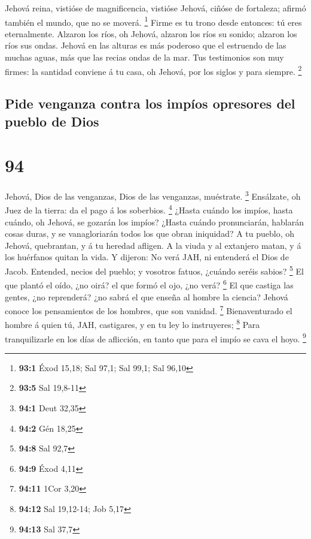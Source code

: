  Jehová reina, vistióse de magnificencia, vistióse Jehová,
ciñóse de fortaleza; afirmó también el mundo, que no se moverá.
\footnote{\textbf{93:1} Éxod 15,18; Sal 97,1; Sal 99,1; Sal 96,10}
 Firme es tu trono desde entonces: tú eres eternalmente.
 Alzaron los ríos, oh Jehová, alzaron los ríos su sonido;
alzaron los ríos sus ondas.  Jehová en las alturas es más
poderoso que el estruendo de las muchas aguas, más que las recias ondas
de la mar.  Tus testimonios son muy firmes: la santidad
conviene á tu casa, oh Jehová, por los siglos y para siempre.
\footnote{\textbf{93:5} Sal 19,8-11}

\hypertarget{pide-venganza-contra-los-impuxedos-opresores-del-pueblo-de-dios}{%
\subsection{Pide venganza contra los impíos opresores del pueblo de
Dios}\label{pide-venganza-contra-los-impuxedos-opresores-del-pueblo-de-dios}}

\hypertarget{section-93}{%
\section{94}\label{section-93}}

 Jehová, Dios de las venganzas, Dios de las venganzas,
muéstrate. \footnote{\textbf{94:1} Deut 32,35}  Ensálzate,
oh Juez de la tierra: da el pago á los soberbios. \footnote{\textbf{94:2}
  Gén 18,25}  ¿Hasta cuándo los impíos, hasta cuándo, oh
Jehová, se gozarán los impíos?  ¿Hasta cuándo pronunciarán,
hablarán cosas duras, y se vanagloriarán todos los que obran iniquidad?
 A tu pueblo, oh Jehová, quebrantan, y á tu heredad afligen.
 A la viuda y al extanjero matan, y á los huérfanos quitan
la vida.  Y dijeron: No verá JAH, ni entenderá el Dios de
Jacob.  Entended, necios del pueblo; y vosotros fatuos,
¿cuándo seréis sabios? \footnote{\textbf{94:8} Sal 92,7}  El
que plantó el oído, ¿no oirá? el que formó el ojo, ¿no verá? \footnote{\textbf{94:9}
  Éxod 4,11}  El que castiga las gentes, ¿no reprenderá?
¿no sabrá el que enseña al hombre la ciencia?  Jehová
conoce los pensamientos de los hombres, que son vanidad. \footnote{\textbf{94:11}
  1Cor 3,20}  Bienaventurado el hombre á quien tú, JAH,
castigares, y en tu ley lo instruyeres; \footnote{\textbf{94:12} Sal
  19,12-14; Job 5,17}  Para tranquilizarle en los días de
aflicción, en tanto que para el impío se cava el hoyo. \footnote{\textbf{94:13}
  Sal 37,7}

